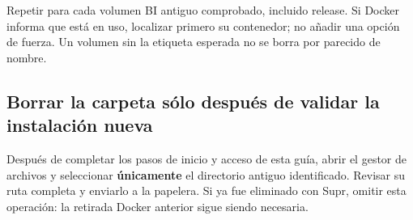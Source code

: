 \documentclass[
  spanish,
  10pt,
  a4paper,
]{article}
\newenvironment{Shaded}{}{}
\newcommand{\AttributeTok}[1]{#1}
\newcommand{\BuiltInTok}[1]{#1}
\newcommand{\ExtensionTok}[1]{#1}
\newcommand{\FunctionTok}[1]{#1}
\newcommand{\KeywordTok}[1]{\textbf{#1}}
\newcommand{\NormalTok}[1]{#1}
\newcommand{\OperatorTok}[1]{#1}
\newcommand{\OtherTok}[1]{#1}
\newcommand{\PreprocessorTok}[1]{\textbf{#1}}
\newcommand{\SpecialStringTok}[1]{#1}
\newcommand{\StringTok}[1]{#1}
\newcommand{\VariableTok}[1]{#1}
\renewenvironment{Shaded}{\begin{snugshade}}{\end{snugshade}}%
\begin{document}
\begin{Shaded}
\end{Shaded}

Repetir para cada volumen BI antiguo comprobado, incluido release. Si
Docker informa que está en uso, localizar primero su contenedor; no
añadir una opción de fuerza. Un volumen sin la etiqueta esperada no se
borra por parecido de nombre.

\subsection{Borrar la carpeta sólo después de validar la instalación
nueva}\label{borrar-la-carpeta-suxf3lo-despuuxe9s-de-validar-la-instalaciuxf3n-nueva}

Después de completar los pasos de inicio y acceso de esta guía, abrir el
gestor de archivos y seleccionar \textbf{únicamente} el directorio
antiguo identificado. Revisar su ruta completa y enviarlo a la papelera.
Si ya fue eliminado con Supr, omitir esta operación: la retirada Docker
anterior sigue siendo necesaria.
\end{document}
